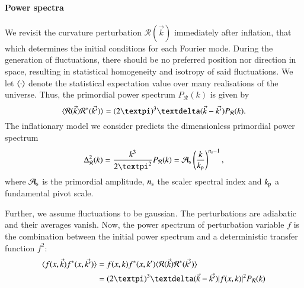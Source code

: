 




\paragraph{Power spectra}
We revisit the curvature perturbation $\mathcal{R}(\vec{k})$ immediately after inflation, that which determines the initial conditions for each Fourier mode. During the generation of fluctuations, there should be no preferred position nor direction in space, resulting in statistical homogeneity and isotropy of said fluctuations. We let $\langle \cdot \rangle$ denote the statistical expectation value over many realisations of the universe. Thus, the primordial power spectrum $P_\mathcal{R}(k)$ is given by
\begin{equation}\label{mil4:theo:eq:primordial_power_spectum}
    \avg{\mathcal{R}(\vec{k})\mathcal{R}^*(\vec{k'})} = (2\pi)^3 \diracdeltafunc{\vec{k}-\vec{k'}}P_\mathcal{R}(k).
\end{equation}
The inflationary model we consider predicts the dimensionless primordial power spectrum
\begin{equation}\label{mil4:theo:eq:Delta_R_of_k}
    \Delta^2_\mathcal{R} (k) = \frac{k^3}{2\pi^2} P_\mathcal{R} (k)= \As \left( \frac{k}{k\ped{p}} \right)^{\ns -1},
\end{equation}
where $\mathcal{A}_\mathrm{s}$ is the primordial amplitude, $n_\mathrm{s}$ the scaler spectral index and $k_\mathrm{p}$ a fundamental pivot scale.

Further, we assume fluctuations to be gaussian. The perturbations are adiabatic and their averages vanish. Now, the power spectrum of perturbation variable $f$ is the combination between the initial power spectrum and a deterministic transfer function $f^2$:
\begin{equation}\label{mil4:theo:eq:defining_power_spectrum}
\begin{split}
    \avg{f(x,\vec{k}) f^\ast(x,\vec{k'})} &= f(x,k)f^\ast(x,k') \avg{\mathcal{R}(\vec{k})\mathcal{R}^*(\vec{k'})} \\
    &= (2\pi)^3 \diracdeltafunc{\vec{k}-\vec{k'}} \abs{f(x,k)}^2 P_\mathcal{R}(k)
\end{split}
\end{equation}


